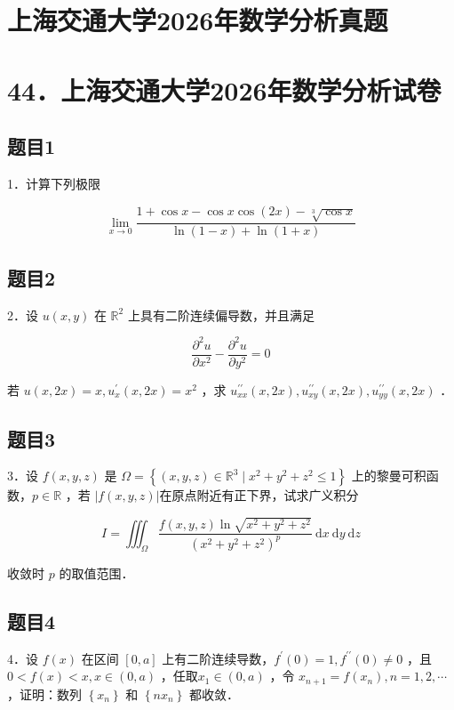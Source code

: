 \documentclass{article}
\begin{document}
\section*{上海交通大学2026年数学分析真题}
\section*{44．上海交通大学2026年数学分析试卷}

\subsection{题目1}
1．计算下列极限

\[
\lim _{x \rightarrow 0} \frac{1+\cos x-\cos x \cos (2 x)-\sqrt[3]{\cos x}}{\ln (1-x)+\ln (1+x)}
\]

\subsection{题目2}
2．设 \(u(x, y)\) 在 \(\mathbb{R}^{2}\) 上具有二阶连续偏导数，并且满足

\[
\frac{\partial^{2} u}{\partial x^{2}}-\frac{\partial^{2} u}{\partial y^{2}}=0
\]

若 \(u(x, 2 x)=x, u_{x}^{\prime}(x, 2 x)=x^{2}\) ，求 \(u_{x x}^{\prime \prime}(x, 2 x), u_{x y}^{\prime \prime}(x, 2 x), u_{y y}^{\prime \prime}(x, 2 x)\) ．

\subsection{题目3}
3．设 \(f(x, y, z)\) 是 \(\Omega=\left\{(x, y, z) \in \mathbb{R}^{3} \mid x^{2}+y^{2}+z^{2} \leq 1\right\}\) 上的黎曼可积函数，\(p \in \mathbb{R}\) ，若 \(|f(x, y, z)|\)在原点附近有正下界，试求广义积分

\[
I=\iiint_{\Omega} \frac{f(x, y, z) \ln \sqrt{x^{2}+y^{2}+z^{2}}}{\left(x^{2}+y^{2}+z^{2}\right)^{p}} \mathrm{~d} x \mathrm{~d} y \mathrm{~d} z
\]

收敛时 \(p\) 的取值范围．

\subsection{题目4}
4．设 \(f(x)\) 在区间 \([0, a]\) 上有二阶连续导数，\(f^{\prime}(0)=1, f^{\prime \prime}(0) \neq 0\) ，且 \(0<f(x)<x, x \in(0, a)\) ，任取\(x_{1} \in(0, a)\) ，令 \(x_{n+1}=f\left(x_{n}\right), n=1,2, \cdots\) ，证明：数列 \(\left\{x_{n}\right\}\) 和 \(\left\{n x_{n}\right\}\) 都收敛．
\end{document}
